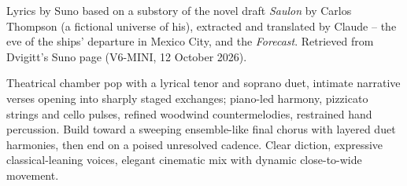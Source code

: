 
\begin{notes}
Lyrics by Suno based on a substory of the novel draft \emph{Saulon} by Carlos Thompson (a fictional universe of his), extracted and translated by Claude -- the eve of the ships' departure in Mexico City, and the \emph{Forecast}. Retrieved from Dvigitt's Suno page (V6-MINI, 12 October 2026).
\end{notes}
\begin{style}
Theatrical chamber pop with a lyrical tenor and soprano duet, intimate narrative verses opening into sharply staged exchanges; piano-led harmony, pizzicato strings and cello pulses, refined woodwind countermelodies, restrained hand percussion. Build toward a sweeping ensemble-like final chorus with layered duet harmonies, then end on a poised unresolved cadence. Clear diction, expressive classical-leaning voices, elegant cinematic mix with dynamic close-to-wide movement.
\end{style}
